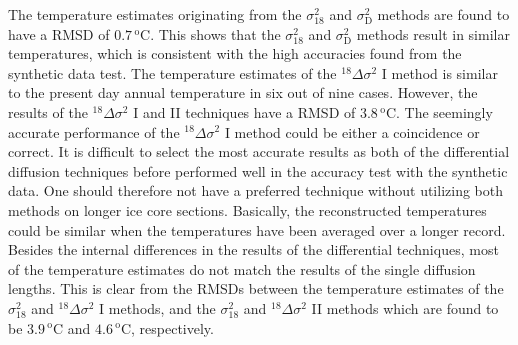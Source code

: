\documentclass[11pt, draftcls, onecolumn]{IEEEtran} %
\numberwithin{equation}{section}
\numberwithin{table}{section}
\numberwithin{figure}{section}
\begin{document}
The temperature estimates originating from the $\sigma^2_{18}$ and $\sigma^2_{\mathrm{D}}$ methods are found to have a RMSD of $0.7\,^\mathrm{o}\mathrm{C}$. This shows that the $\sigma^2_{18}$ and $\sigma^2_{\mathrm{D}}$ methods result in similar temperatures, which is consistent with the high accuracies found from the synthetic data test.
The temperature estimates of the ${}^{18}\Delta\sigma^2$ I method is similar to the present day annual temperature in six out of nine cases. 
However, the results of the ${}^{18}\Delta\sigma^2$ I and II techniques have a RMSD of $3.8\,^\mathrm{o}\mathrm{C}$.
The seemingly accurate performance of the ${}^{18}\Delta\sigma^2$ I method could be either a coincidence or correct. 
It is difficult to select the most accurate results as both of the differential diffusion techniques
before performed well in the accuracy test with the synthetic data.
One should therefore not have a preferred technique without utilizing both methods on longer ice core sections.
Basically, the reconstructed temperatures could be similar when the temperatures have been averaged over a longer record.
Besides the internal differences in the results of the differential techniques, most of the temperature estimates do not 
match the results of the single diffusion lengths.
This is clear from the RMSDs between the temperature estimates of the $\sigma^2_{18}$ and ${}^{18}\Delta\sigma^2$ I methods, 
and the $\sigma^2_{18}$ and ${}^{18}\Delta\sigma^2$ II methods which are found to be  
$3.9\,^\mathrm{o}\mathrm{C}$ and $4.6\,^\mathrm{o}\mathrm{C}$, respectively.


\end{document}
